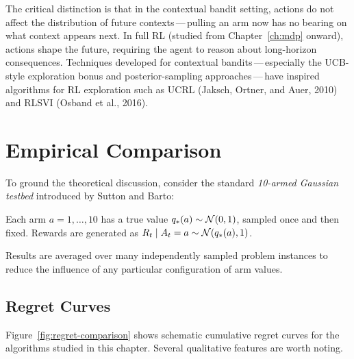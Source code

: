 The critical distinction is that in the contextual bandit setting, actions do not affect the distribution of future contexts\,---\,pulling an arm now has no bearing on what context appears next.  In full RL (studied from Chapter~\ref{ch:mdp} onward), actions shape the future, requiring the agent to reason about long-horizon consequences.  Techniques developed for contextual bandits\,---\,especially the UCB-style exploration bonus and posterior-sampling approaches\,---\,have inspired algorithms for RL exploration such as UCRL (Jaksch, Ortner, and Auer, 2010) and RLSVI (Osband et al., 2016).


\section{Empirical Comparison}
\label{sec:bandit-experiments}

To ground the theoretical discussion, consider the standard \emph{10-armed Gaussian testbed} introduced by Sutton and Barto:

\begin{example}
\label{ex:testbed}
Each arm $a=1,\dots,10$ has a true value $q_*(a)\sim\mathcal{N}(0,1)$, sampled once and then fixed.  Rewards are generated as $R_t\mid A_t=a \sim \mathcal{N}(q_*(a),1)$.
\end{example}

Results are averaged over many independently sampled problem instances to reduce the influence of any particular configuration of arm values.

\subsection*{Regret Curves}

Figure~\ref{fig:regret-comparison} shows schematic cumulative regret curves for the algorithms studied in this chapter.  Several qualitative features are worth noting.

